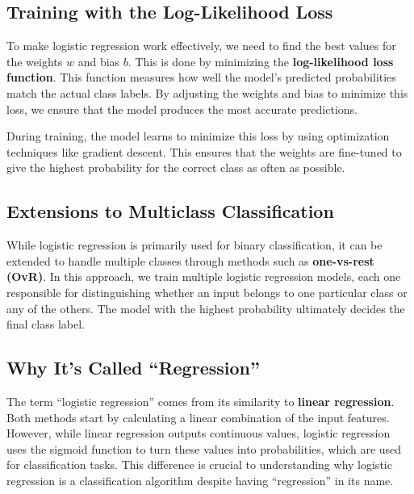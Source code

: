 \subsection{Training with the Log-Likelihood Loss}
\begin{flushleft}
    \large To make logistic regression work effectively, we need to find the best values for the weights \( w \) and bias \( b \). This is done by minimizing the \textbf{log-likelihood loss function}. This function measures how well the model’s predicted probabilities match the actual class labels. By adjusting the weights and bias to minimize this loss, we ensure that the model produces the most accurate predictions.

    During training, the model learns to minimize this loss by using optimization techniques like gradient descent. This ensures that the weights are fine-tuned to give the highest probability for the correct class as often as possible.
\end{flushleft}

\subsection{Extensions to Multiclass Classification}
\begin{flushleft}
    \large While logistic regression is primarily used for binary classification, it can be extended to handle multiple classes through methods such as \textbf{one-vs-rest (OvR)}. In this approach, we train multiple logistic regression models, each one responsible for distinguishing whether an input belongs to one particular class or any of the others. The model with the highest probability ultimately decides the final class label.
\end{flushleft}

\subsection{Why It's Called “Regression”}
\begin{flushleft}
    \large The term ``logistic regression'' comes from its similarity to \textbf{linear regression}. Both methods start by calculating a linear combination of the input features. However, while linear regression outputs continuous values, logistic regression uses the sigmoid function to turn these values into probabilities, which are used for classification tasks. This difference is crucial to understanding why logistic regression is a classification algorithm despite having ``regression'' in its name.
\end{flushleft}

